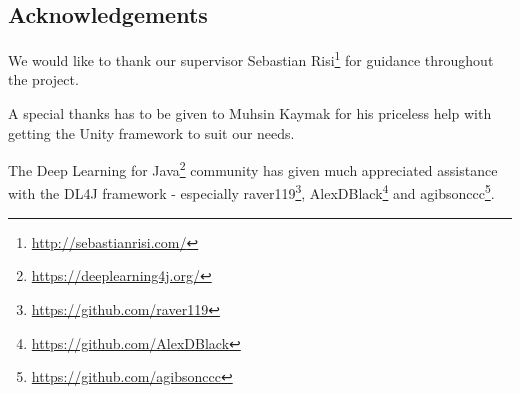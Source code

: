
\begin{center}
\section*{Acknowledgements}
\vspace{1em}
\end{center}


\begin{addmargin}[4em]{4em}
\noindent
We would like to thank our supervisor Sebastian Risi\footnote{\url{http://sebastianrisi.com/}} for guidance throughout the project.

A special thanks has to be given to Muhsin Kaymak for his priceless help with getting the Unity framework to suit our needs.

The Deep Learning for Java\footnote{\url{https://deeplearning4j.org/}} community has given much appreciated assistance with the DL4J framework - especially raver119\footnote{\url{https://github.com/raver119}}, AlexDBlack\footnote{\url{https://github.com/AlexDBlack}} and agibsonccc\footnote{\url{https://github.com/agibsonccc}}.

\end{addmargin}








